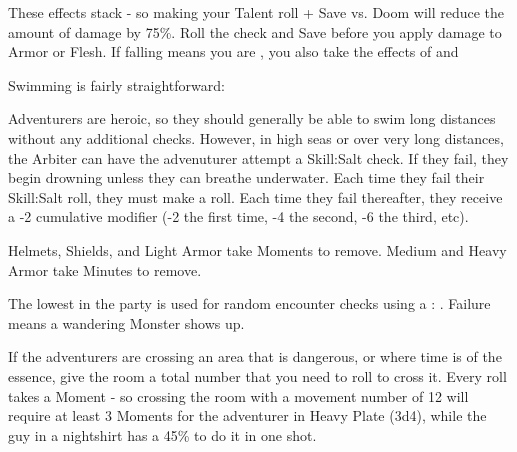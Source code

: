 {  These effects stack - so making your Talent roll + Save vs. Doom will reduce the amount of damage by 75\%.  Roll the check and Save before you apply damage to Armor or Flesh.  If falling means you are , you also take the effects of  and 




Swimming is fairly straightforward:


Adventurers are heroic, so they should generally be able to swim long distances without any additional checks.  However, in high seas or over very long distances, the Arbiter can have the advenuturer attempt a Skill:Salt check.  If they fail, they begin drowning unless they can breathe underwater.  Each time they fail their Skill:Salt roll, they must make a \DEATH roll.  Each time they fail thereafter, they receive a -2 cumulative modifier (-2 the first time, -4 the second, -6 the third, etc).  


  Helmets, Shields, and Light Armor take Moments to remove.  Medium and Heavy Armor take Minutes to remove.

\cbreak


  The lowest \MD in the party is used for random encounter checks using a \RS : \MD.  Failure means a wandering Monster shows up. 


  If the adventurers are crossing an area that is dangerous, or where time is of the essence, give the room a total number that you need to roll to cross it.  Every \MD roll takes a Moment - so crossing the room with a movement number of 12 will require at least 3 Moments for the adventurer in Heavy Plate (3d4), while the guy in a nightshirt has a 45\% to do it in one shot.


}
